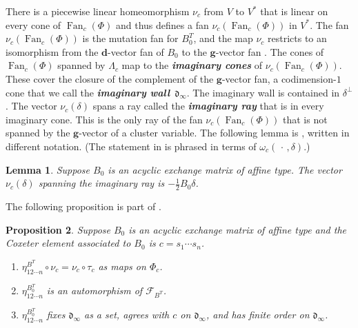 \documentclass[10pt]{article}
\newtheorem{proposition}{Proposition}[section]
\newtheorem{lemma}[proposition]{Lemma}
\theoremstyle{definition}
\theoremstyle{remark}
\numberwithin{equation}{section}
\newcommand{\newword}[1]{\textbf{\emph{#1}}}
\newcommand{\F}{{\mathcal F}}
\newcommand{\0}{{\mathbf{0}}}
\newcommand{\g}{\mathbf{g}}
\newcommand{\Fan}{\operatorname{Fan}}
\renewcommand{\d}{{\mathfrak d}}
\newcommand{\dd}{{\mathbf d}}
\newcommand{\RSChar}{\Phi}
\newcommand{\RS}{\RSChar}
\newcommand{\AP}[1]{\RS_{#1}}
\newcommand{\APTChar}{\Lambda}
\newcommand{\APT}[1]{\APTChar_{#1}}
\begin{document}
There is a piecewise linear homeomorphism $\nu_c$ from $V$ to $V^*$ that is linear on every cone of $\Fan_c(\RS)$ and thus defines a fan $\nu_c(\Fan_c(\RS))$ in $V^*$.
The fan $\nu_c(\Fan_c(\RS))$ is the mutation fan for $B_0^T$, and the map $\nu_c$ restricts to an isomorphism from the $\dd$-vector fan of $B_0$ to the $\g$-vector fan \cite[Theorem~2.9]{affscat}. 
The cones of $\Fan_c(\RS)$ spanned by $\APT{c}$ map to the \newword{imaginary cones} of $\nu_c(\Fan_c(\RS))$.
These cover the closure of the complement of the $\g$-vector fan, a codimension-$1$ cone that we call the \newword{imaginary wall}~$\d_\infty$.
The imaginary wall is contained in $\delta^\perp$.
The vector $\nu_c(\delta)$ spans a ray called the \newword{imaginary ray} that is in every imaginary cone.
This is the only ray of the fan $\nu_c(\Fan_c(\RS))$ that is not spanned by the $\g$-vector of a cluster variable.
The following lemma is \cite[Lemma~5.9]{affscat}, written in different notation.
(The statement in \cite{affscat} is phrased in terms of $\omega_c(\,\cdot\,,\delta)$.)

\begin{lemma}\label{nu delta}  
Suppose $B_0$ is an acyclic exchange matrix of affine type.
The vector~$\nu_c(\delta)$ spanning the imaginary ray is $-\frac12B_0\delta$.
\end{lemma}

The following proposition is part of \cite[Proposition~7.31]{affscat}.

\begin{proposition}\label{eta nice} 
Suppose $B_0$ is an acyclic exchange matrix of affine type and the Coxeter element associated to $B_0$ is $c=s_1\cdots s_n$.
\begin{enumerate}[label=\bf\arabic*., ref=\arabic*]
\item \label{nu tau}   
$\eta^{B^T}_{12\cdots n}\circ\nu_c=\nu_c\circ\tau_c$ as maps on $\AP{c}$.
\item\label{eta aut mut}
$\eta^{B_0^T}_{12\cdots n}$ is an automorphism of $\F_{B^T}$.
\item\label{eta is c}
$\eta^{B_0^T}_{12\cdots n}$ fixes $\d_\infty$ as a set, agrees with $c$ on $\d_\infty$, and has finite order on $\d_\infty$.
\end{enumerate}
\end{proposition}
\end{document}
